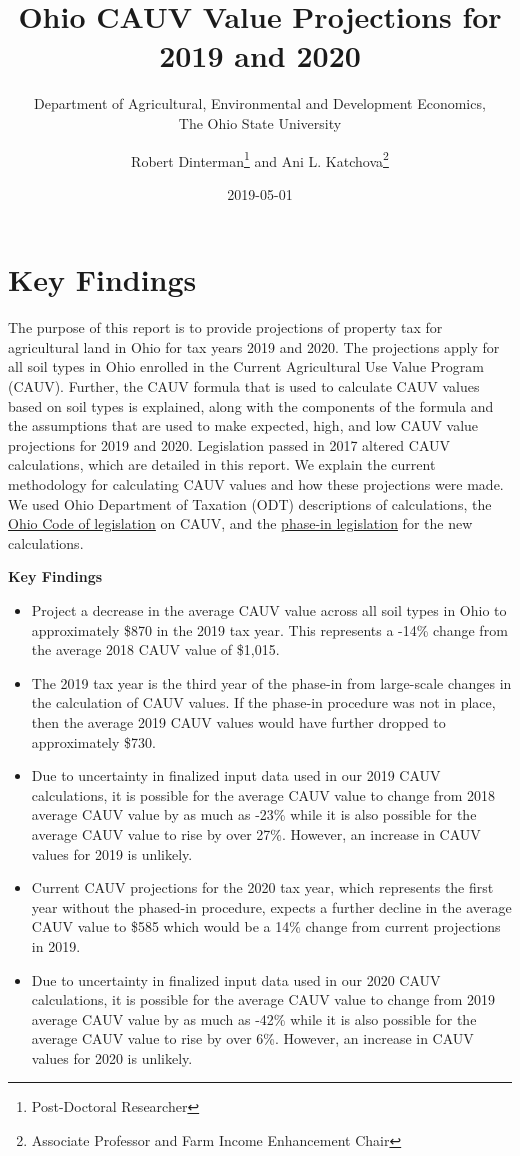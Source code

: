 \documentclass[]{article}
\title{Ohio CAUV Value Projections for 2019 and 2020}
\subtitle{Department of Agricultural, Environmental and Development Economics,\\
The Ohio State University}
\author{Robert Dinterman\footnote{Post-Doctoral Researcher} and Ani L.
Katchova\footnote{Associate Professor and Farm Income Enhancement Chair}}
\date{2019-05-01}
\providecommand{\tightlist}{%
  \setlength{\itemsep}{0pt}\setlength{\parskip}{0pt}}
\begin{document}
\maketitle

\hypertarget{key-findings}{%
\section{Key Findings}\label{key-findings}}

The purpose of this report is to provide projections of property tax for
agricultural land in Ohio for tax years 2019 and 2020. The projections
apply for all soil types in Ohio enrolled in the Current Agricultural
Use Value Program (CAUV). Further, the CAUV formula that is used to
calculate CAUV values based on soil types is explained, along with the
components of the formula and the assumptions that are used to make
expected, high, and low CAUV value projections for 2019 and 2020.
Legislation passed in 2017 altered CAUV calculations, which are detailed
in this report. We explain the current methodology for calculating CAUV
values and how these projections were made. We used Ohio Department of
Taxation (ODT) descriptions of calculations, the
\href{http://codes.ohio.gov/orc/5713.31}{Ohio Code of legislation} on
CAUV, and the \href{http://codes.ohio.gov/orc/5715.01}{phase-in
legislation} for the new calculations.

\textbf{Key Findings}

\begin{itemize}
\tightlist
\item
  Project a decrease in the average CAUV value across all soil types in
  Ohio to approximately \$870 in the 2019 tax year. This represents a
  -14\% change from the average 2018 CAUV value of \$1,015.
\item
  The 2019 tax year is the third year of the phase-in from large-scale
  changes in the calculation of CAUV values. If the phase-in procedure
  was not in place, then the average 2019 CAUV values would have further
  dropped to approximately \$730.
\item
  Due to uncertainty in finalized input data used in our 2019 CAUV
  calculations, it is possible for the average CAUV value to change from
  2018 average CAUV value by as much as -23\% while it is also possible
  for the average CAUV value to rise by over 27\%. However, an increase
  in CAUV values for 2019 is unlikely.
\item
  Current CAUV projections for the 2020 tax year, which represents the
  first year without the phased-in procedure, expects a further decline
  in the average CAUV value to \$585 which would be a 14\% change from
  current projections in 2019.
\item
  Due to uncertainty in finalized input data used in our 2020 CAUV
  calculations, it is possible for the average CAUV value to change from
  2019 average CAUV value by as much as -42\% while it is also possible
  for the average CAUV value to rise by over 6\%. However, an increase
  in CAUV values for 2020 is unlikely.
\end{itemize}
\end{document}
